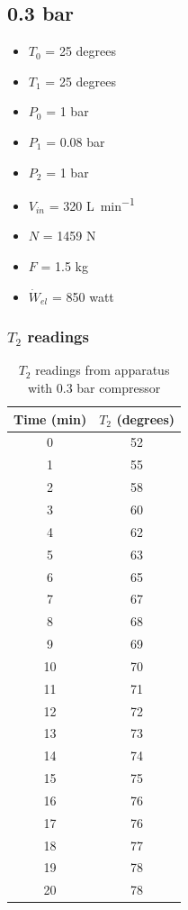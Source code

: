 \documentclass[class=article, crop=false, 12pt,a4paper]{standalone}
\begin{document}
\subsection{0.3 bar}
\begin{multicols}{2}
  \begin{itemize}[noitemsep]
    \item \(T_0\) = 25 degrees
    \item \(T_1\) = 25 degrees
    \item \(P_0\) = 1 \si{\bar}
    \item \(P_1\) = 0.08 \si{\bar}
    \item \(P_2\) = 1 \si{\bar}
    \item \(V_{in}\) = 320 \si{\liter\per\minute}
    \item \(N\) = 1459 \si{\newton}
    \item \(F\) = 1.5 \si{\kilogram}
    \item \(\dot{W}_{el}\) = 850 \si{watt}
  \end{itemize}
\end{multicols}
\subsubsection{\(T_2\) readings}
\begin{table}
  \centering
    \begin{tabular}{|c|c|}
      \hline
      Time (\si{\minute}) & \(T_2\) (degrees)\\
      \hline  
      0 & 52\\
      1 & 55\\
      2 & 58\\
      3 & 60\\
      4 & 62\\
      5 & 63\\
      6 & 65\\
      7 & 67\\
      8 & 68\\
      9 & 69\\
      10 & 70\\
      11 & 71\\
      12 & 72\\
      13 & 73\\
      14 & 74\\
      15 & 75\\
      16 & 76\\
      17 & 76\\
      18 & 77\\
      19 & 78\\
      20 & 78\\
      \hline
    \end{tabular}
  \caption{\(T_2\) readings from apparatus with 0.3 bar compressor}
  \label{table:3}
\end{table}
\end{document}
